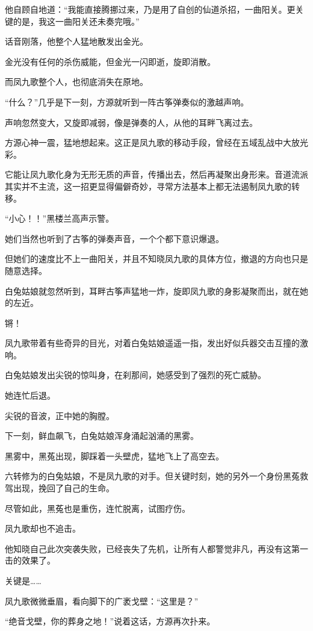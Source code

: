 \begin{this_body}
他自顾自地道：“我能直接腾挪过来，乃是用了自创的仙道杀招，一曲阳关。更关键的是，我这一曲阳关还未奏完哦。”

话音刚落，他整个人猛地散发出金光。

金光没有任何的杀伤威能，但金光一闪即逝，旋即消散。

而凤九歌整个人，也彻底消失在原地。

“什么？”几乎是下一刻，方源就听到一阵古筝弹奏似的激越声响。

声响忽然变大，又旋即减弱，像是弹奏的人，从他的耳畔飞离过去。

方源心神一震，猛地想起来。这正是凤九歌的移动手段，曾经在五域乱战中大放光彩。

它能让凤九歌化身为无形无质的声音，传播出去，然后再凝聚出身形来。音道流派其实并不主流，这一招更显得偏僻奇妙，寻常方法基本上都无法遏制凤九歌的转移。

“小心！！”黑楼兰高声示警。

她们当然也听到了古筝的弹奏声音，一个个都下意识爆退。

但她们的速度比不上一曲阳关，并且不知晓凤九歌的具体方位，撤退的方向也只是随意选择。

白兔姑娘就忽然听到，耳畔古筝声猛地一炸，旋即凤九歌的身影凝聚而出，就在她的左近。

锵！

凤九歌带着有些奇异的目光，对着白兔姑娘遥遥一指，发出好似兵器交击互撞的激响。

白兔姑娘发出尖锐的惊叫身，在刹那间，她感受到了强烈的死亡威胁。

她连忙后退。

尖锐的音波，正中她的胸膛。

下一刻，鲜血飙飞，白兔姑娘浑身涌起汹涌的黑雾。

黑雾中，黑菟出现，脚踩着一头壁虎，猛地飞上了高空去。

六转修为的白兔姑娘，不是凤九歌的对手。但关键时刻，她的另外一个身份黑菟救驾出现，挽回了自己的生命。

尽管如此，黑菟也是重伤，连忙脱离，试图疗伤。

凤九歌却也不追击。

他知晓自己此次突袭失败，已经丧失了先机，让所有人都警觉非凡，再没有这第一击的效果了。

关键是……

凤九歌微微垂眉，看向脚下的广袤戈壁：“这里是？”

“绝音戈壁，你的葬身之地！”说着这话，方源再次扑来。


\end{this_body}
